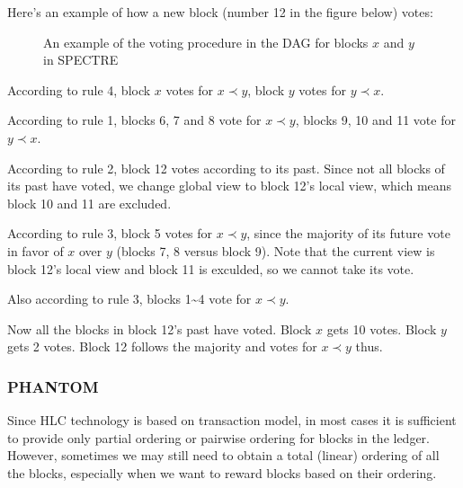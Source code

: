 \documentclass[a4paper,11pt]{article}
\begin{document}
Here's an example of how a new block (number 12 in the figure below) votes:

\begin{figure}[h]
	\centerline{%
	}
\caption{An example of the voting procedure in the DAG for blocks $x$ and $y$ in SPECTRE}
\end{figure}

According to rule 4, block $x$ votes for $x \prec y$, block $y$ votes for $y
\prec x$.

According to rule 1, blocks 6, 7 and 8 vote for $x \prec y$, blocks 9, 10 and 11
vote for $y \prec x$.

According to rule 2, block 12 votes according to its past. Since not all blocks
of its past have voted, we change global view to block 12's local view, which
means block 10 and 11 are excluded.

According to rule 3, block 5 votes for $x \prec y$, since the majority of its
future vote in favor of $x$ over $y$ (blocks 7, 8 versus block 9). Note that the
current view is block 12's local view and block 11 is exculded, so we cannot
take its vote.

Also according to rule 3, blocks 1\textasciitilde4 vote for $x \prec y$.

Now all the blocks in block 12's past have voted. Block $x$ gets 10 votes. Block
$y$ gets 2 votes. Block 12 follows the majority and votes for $x \prec y$ thus.

\subsubsection*{PHANTOM}

Since HLC technology is based on transaction model, in most cases it is
sufficient to provide only partial ordering or pairwise ordering for blocks in
the ledger. However, sometimes we may still need to obtain a total (linear)
ordering of all the blocks, especially when we want to reward blocks based on
their ordering. 
\end{document}
